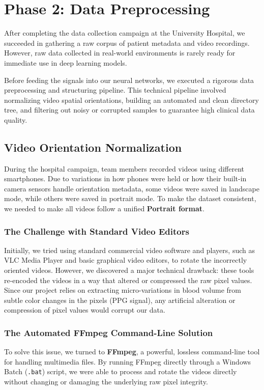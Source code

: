 \section{Phase 2: Data Preprocessing}
\label{sec:phase2_preprocessing}
After completing the data collection campaign at the University Hospital, we succeeded in gathering a raw corpus of patient metadata and video recordings. However, raw data collected in real-world environments is rarely ready for immediate use in deep learning models. 

Before feeding the signals into our neural networks, we executed a rigorous data preprocessing and structuring pipeline. This technical pipeline involved normalizing video spatial orientations, building an automated and clean directory tree, and filtering out noisy or corrupted samples to guarantee high clinical data quality.

\subsection{Video Orientation Normalization}
During the hospital campaign, team members recorded videos using different smartphones. Due to variations in how phones were held or how their built-in camera sensors handle orientation metadata, some videos were saved in landscape mode, while others were saved in portrait mode. To make the dataset consistent, we needed to make all videos follow a unified \textbf{Portrait format}.

\subsubsection{The Challenge with Standard Video Editors}
Initially, we tried using standard commercial video software and players, such as VLC Media Player and basic graphical video editors, to rotate the incorrectly oriented videos. However, we discovered a major technical drawback: these tools re-encoded the videos in a way that altered or compressed the raw pixel values. Since our project relies on extracting micro-variations in blood volume from subtle color changes in the pixels (PPG signal), any artificial alteration or compression of pixel values would corrupt our data.

\subsubsection{The Automated FFmpeg Command-Line Solution}
To solve this issue, we turned to \textbf{FFmpeg}, a powerful, lossless command-line tool for handling multimedia files. By running FFmpeg directly through a Windows Batch (\texttt{.bat}) script, we were able to process and rotate the videos directly without changing or damaging the underlying raw pixel integrity.

